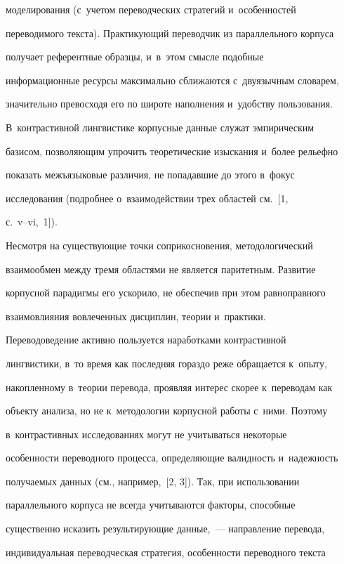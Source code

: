 моделирования (с~учетом переводческих стратегий и~особенностей 


переводимого текста). Практикующий переводчик из параллельного корпуса 


получает референтные образцы, и~в~этом смысле подобные 


информационные ресурсы максимально сближаются с~двуязычным словарем, 


значительно превосходя его по широте наполнения и~удобству пользования. 


В~контрастивной лингвистике корпусные данные служат эмпирическим 


базисом, позволяющим упрочить теоретические изыскания и~более рельефно 


показать межъ\-язы\-ко\-вые различия, не попадавшие до этого в~фокус 


исследования (подробнее о~взаимодействии трех областей см.~[1,  


с.~v--vi,~1]).


  


  Несмотря на существующие точки соприкосновения, методологический 


взаимообмен между тремя областями не является паритетным. Развитие 


корпусной парадигмы его ускорило, не обеспечив при этом равноправного 


взаимовлияния вовлеченных дисциплин, теории и~практики. 


Переводоведение активно пользуется наработками контрастивной 


лингвистики, в~то время как последняя гораздо реже обращается к~опыту, 


накопленному в~теории перевода, проявляя интерес скорее к~переводам как 


объекту анализа, но не к~методологии корпусной работы с~ними. Поэтому 


в~контрастивных исследованиях могут не учитываться некоторые 


особенности переводного процесса, определяющие валидность и~надежность 


получаемых данных (см., например,~[2, 3]). Так, при использовании 


параллельного корпуса не всегда учитываются факторы, способные 


существенно исказить результирующие данные,~--- направление перевода, 


индивидуальная переводческая стратегия, особенности переводного текста 


